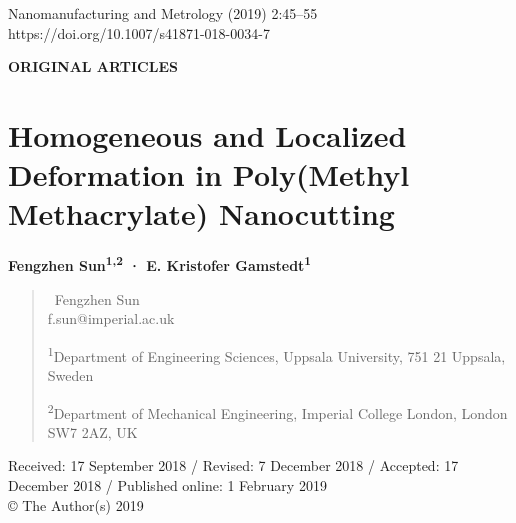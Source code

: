 \documentclass{article}
\newcommand{\envelope}{{\fontspec{DejaVu Sans}✉}}
\begin{document}

\noindent Nanomanufacturing and Metrology (2019) 2:45–55\\
https://doi.org/10.1007/s41871-018-0034-7

\noindent\textbf{ORIGINAL ARTICLES}

\section*{Homogeneous and Localized Deformation in Poly(Methyl Methacrylate) Nanocutting}

\noindent\textbf{Fengzhen Sun\textsuperscript{1,2} · E. Kristofer Gamstedt\textsuperscript{1}}

\begin{quote}\small
\noindent \envelope\ Fengzhen Sun\\
f.sun@imperial.ac.uk

\noindent \textsuperscript{1}\quad Department of Engineering Sciences, Uppsala University, 751 21 Uppsala, Sweden

\noindent \textsuperscript{2}\quad Department of Mechanical Engineering, Imperial College London, London SW7 2AZ, UK
\end{quote}

\noindent Received: 17 September 2018 / Revised: 7 December 2018 / Accepted: 17 December 2018 / Published online: 1 February 2019\\
© The Author(s) 2019
\end{document}

